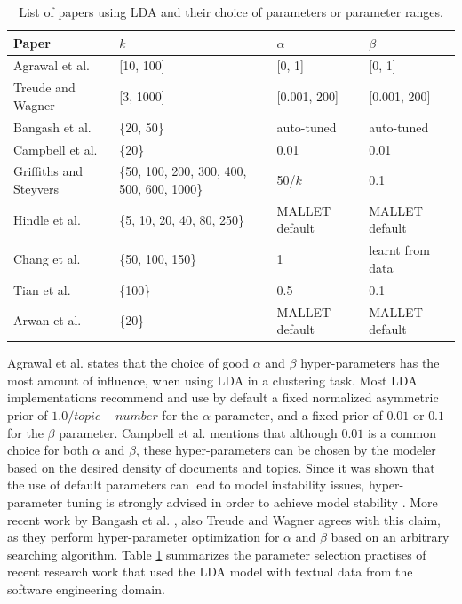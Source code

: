             \begin{table}
              \centering
              \caption{List of papers using LDA and their choice of parameters or parameter ranges.}\label{tab:LDA_params}
                \vspace{6pt} %
              \begin{tabular}{p{4.4 cm} p{3.6 cm} p{2.0cm} p{3.0cm}}
                \hline
                Paper & $k$ & $\alpha$ & $\beta$ \\
                \hline\hline
                Agrawal et al. \cite{agrawal2018wrong} & [10, 100] & [0, 1] & [0, 1] \\
                Treude and Wagner \cite{treude2019predicting} & [3, 1000] & [0.001, 200] & [0.001, 200] \\
                Bangash et al. \cite{bangash2019developers} & \{20, 50\} & auto-tuned & auto-tuned \\
                Campbell et al. \cite{campbell2015latent} & \{20\} & 0.01 & 0.01 \\
                Griffiths and Steyvers \cite{griffiths2004finding} & \{50, 100, 200, 300, 400, 500, 600, 1000\} & 50/$k$ & 0.1 \\
                Hindle et al. \cite{hindle2012relating} & \{5, 10, 20, 40, 80, 250\} & MALLET default & MALLET default \\
                Chang et al. \cite{chang2009reading} & \{50, 100, 150\} & 1 & learnt from data \\
                Tian et al. \cite{tian2013predicting} & \{100\} & 0.5 & 0.1 \\
                Arwan et al. \cite{arwan2015source} & \{20\} & MALLET default & MALLET default \\
                \hline
              \end{tabular}
            \end{table}
            
            Agrawal et al. \cite{agrawal2018wrong} states that the choice of good $\alpha$ and $\beta$ hyper-parameters has the most amount of influence, when using LDA in a clustering task. Most LDA implementations recommend and use by default a fixed normalized asymmetric prior of $1.0 / topic-number$ for the $\alpha$ parameter, and a fixed prior of $0.01$ or $0.1$ for the $\beta$ parameter. Campbell et al. \cite{campbell2015latent} mentions that although $0.01$ is a common choice for both $\alpha$ and $\beta$, these hyper-parameters can be chosen by the modeler based on the desired density of documents and topics. Since it was shown that the use of default parameters can lead to model instability issues, hyper-parameter tuning is strongly advised in order to achieve model stability \cite{agrawal2018wrong}. More recent work by Bangash et al. \cite{bangash2019developers}, also Treude and Wagner \cite{treude2019predicting} agrees with this claim, as they perform hyper-parameter optimization for $\alpha$ and $\beta$ based on an arbitrary searching algorithm. Table \ref{tab:LDA_params} summarizes the parameter selection practises of recent research work that used the LDA model with textual data from the software engineering domain.
        
